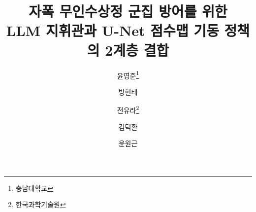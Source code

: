 \documentclass[10pt,twocolumn]{article}
\begin{document}
\title{\bfseries 자폭 무인수상정 군집 방어를 위한\\
LLM 지휘관과 U-Net 점수맵 기동 정책의 2계층 결합}

\author{윤영준\thanks{충남대학교} \and 방현태\footnotemark[1] \and
        전유라\thanks{한국과학기술원} \and 김덕환\footnotemark[2] \and
        윤원근\footnotemark[1]}
\date{}
\twocolumn[\begin{@twocolumnfalse}
\maketitle


\vspace{8pt}
\end{@twocolumnfalse}]









% 
\end{document}
